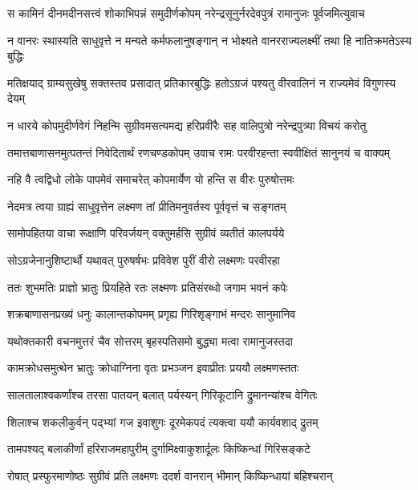 
\twolineshloka
{स कामिनं दीनमदीनसत्त्वं शोकाभिपन्नं समुदीर्णकोपम्}
{नरेन्द्रसूनुर्नरदेवपुत्रं रामानुजः पूर्वजमित्युवाच} %

\twolineshloka
{न वानरः स्थास्यति साधुवृत्ते न मन्यते कर्मफलानुषङ्गान्}
{न भोक्ष्यते वानरराज्यलक्ष्मीं तथा हि नातिक्रमतेऽस्य बुद्धिः} %

\twolineshloka
{मतिक्षयाद् ग्राम्यसुखेषु सक्तस्तव प्रसादात् प्रतिकारबुद्धिः}
{हतोऽग्रजं पश्यतु वीरवालिनं न राज्यमेवं विगुणस्य देयम्} %

\twolineshloka
{न धारये कोपमुदीर्णवेगं निहन्मि सुग्रीवमसत्यमद्य}
{हरिप्रवीरैः सह वालिपुत्रो नरेन्द्रपुत्र्या विचयं करोतु} %

\twolineshloka
{तमात्तबाणासनमुत्पतन्तं निवेदितार्थं रणचण्डकोपम्}
{उवाच रामः परवीरहन्ता स्ववीक्षितं सानुनयं च वाक्यम्} %

\twolineshloka
{नहि वै त्वद्विधो लोके पापमेवं समाचरेत्}
{कोपमार्येण यो हन्ति स वीरः पुरुषोत्तमः} %

\twolineshloka
{नेदमत्र त्वया ग्राह्यं साधुवृत्तेन लक्ष्मण}
{तां प्रीतिमनुवर्तस्व पूर्ववृत्तं च सङ्गतम्} %

\twolineshloka
{सामोपहितया वाचा रूक्षाणि परिवर्जयन्}
{वक्तुमर्हसि सुग्रीवं व्यतीतं कालपर्यये} %

\twolineshloka
{सोऽग्रजेनानुशिष्टार्थो यथावत् पुरुषर्षभः}
{प्रविवेश पुरीं वीरो लक्ष्मणः परवीरहा} %

\twolineshloka
{ततः शुभमतिः प्राज्ञो भ्रातुः प्रियहिते रतः}
{लक्ष्मणः प्रतिसंरब्धो जगाम भवनं कपेः} %

\twolineshloka
{शक्रबाणासनप्रख्यं धनुः कालान्तकोपमम्}
{प्रगृह्य गिरिशृङ्गाभं मन्दरः सानुमानिव} %

\twolineshloka
{यथोक्तकारी वचनमुत्तरं चैव सोत्तरम्}
{बृहस्पतिसमो बुद्ध्या मत्वा रामानुजस्तदा} %

\twolineshloka
{कामक्रोधसमुत्थेन भ्रातुः क्रोधाग्निना वृतः}
{प्रभञ्जन इवाप्रीतः प्रययौ लक्ष्मणस्ततः} %

\twolineshloka
{सालतालाश्वकर्णांश्च तरसा पातयन् बलात्}
{पर्यस्यन् गिरिकूटानि द्रुमानन्यांश्च वेगितः} %

\twolineshloka
{शिलाश्च शकलीकुर्वन् पद्भ्यां गज इवाशुगः}
{दूरमेकपदं त्यक्त्वा ययौ कार्यवशाद् द्रुतम्} %

\twolineshloka
{तामपश्यद् बलाकीर्णां हरिराजमहापुरीम्}
{दुर्गामिक्ष्वाकुशार्दूलः किष्किन्धां गिरिसङ्कटे} %

\twolineshloka
{रोषात् प्रस्फुरमाणोष्ठः सुग्रीवं प्रति लक्ष्मणः}
{ददर्श वानरान् भीमान् किष्किन्धायां बहिश्चरान्} %

